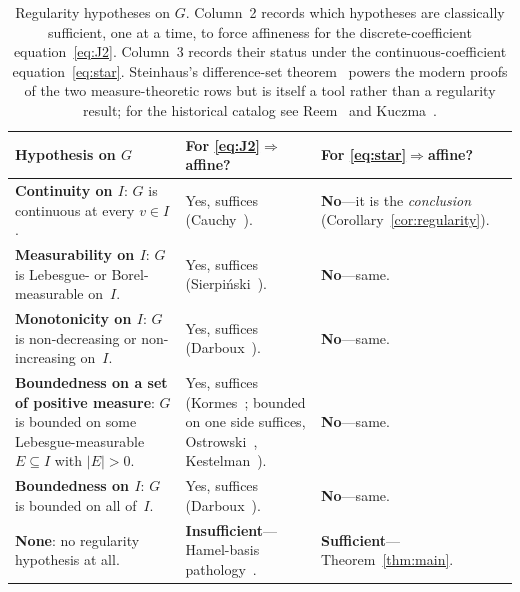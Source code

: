 \documentclass{article}
\theoremstyle{plain}
\theoremstyle{definition}
\begin{document}
\begin{table}[ht]
\renewcommand{\arraystretch}{1.4}
\centering
\begin{tabularx}{\linewidth}{@{} >{\raggedright\arraybackslash}X
  >{\raggedright\arraybackslash}X
  >{\raggedright\arraybackslash}X @{}}
\toprule
\textbf{Hypothesis on $G$} &
\textbf{For \eqref{eq:J2}$\Rightarrow$affine?} &
\textbf{For \eqref{eq:star}$\Rightarrow$affine?} \\
\midrule
\textbf{Continuity on $I$}: $G$ is continuous at every $v\in I$.
  & Yes, suffices (Cauchy~\cite{Cauchy1821}).
  & \textbf{No}---it is the \emph{conclusion} (Corollary~\ref{cor:regularity}). \\
\midrule
\textbf{Measurability on $I$}: $G$ is Lebesgue- or Borel-measurable on~$I$.
  & Yes, suffices (Sierpi\'nski~\cite{Sierpinski1920}).
  & \textbf{No}---same. \\
\midrule
\textbf{Monotonicity on $I$}: $G$ is non-decreasing or non-increasing on~$I$.
  & Yes, suffices (Darboux~\cite{Darboux1875}).
  & \textbf{No}---same. \\
\midrule
\textbf{Boundedness on a set of positive measure}: $G$ is bounded on some
  Lebesgue-measurable $E\subseteq I$ with $|E|>0$.
  & Yes, suffices (Kormes~\cite{Kormes1926}; bounded on one side
    suffices, Ostrowski~\cite{Ostrowski1929},
    Kestelman~\cite{Kestelman1947}).
  & \textbf{No}---same. \\
\midrule
\textbf{Boundedness on $I$}: $G$ is bounded on all of~$I$.
  & Yes, suffices (Darboux~\cite{Darboux1880}).
  & \textbf{No}---same. \\
\midrule
\textbf{None}: no regularity hypothesis at all.
  & \textbf{Insufficient}---Hamel-basis pathology~\cite{Hamel1905}.
  & \textbf{Sufficient}---Theorem~\ref{thm:main}. \\
\bottomrule
\end{tabularx}
\caption{Regularity hypotheses on $G$. Column~2 records which hypotheses
are classically sufficient, one at a time, to force affineness for the
discrete-coefficient equation~\eqref{eq:J2}. Column~3 records their
status under the continuous-coefficient equation~\eqref{eq:star}.
Steinhaus's difference-set theorem~\cite{Steinhaus1920} powers the
modern proofs of the two measure-theoretic rows but is itself a tool
rather than a regularity result; for the historical catalog see
Reem~\cite{Reem2017} and Kuczma~\cite[\S13.2]{Kuczma2009}.}
\label{tab:dictionary}
\end{table}
\end{document}
